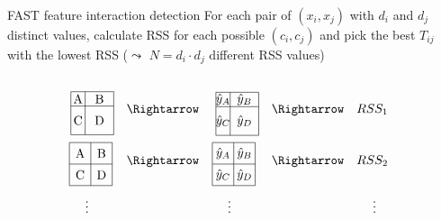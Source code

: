 \documentclass[11pt,compress,t,notes=noshow, aspectratio=169, xcolor=table]{beamer}
\begin{document}
\begin{frame}{FAST feature interaction detection}
For each pair of $(x_i,x_j)$ with $d_i$ and $d_j$ distinct values, calculate RSS for each possible $(c_i, c_j)$ and pick the best $T_{ij}$ with the lowest RSS ($\leadsto$ $N = d_i \cdot d_j$ different RSS values)

\begin{columns}[c, totalwidth=\textwidth]
    \begin{column}{0.45\textwidth}
\[
        \begin{array}{@{}l@{\quad}l@{\quad}l@{\quad}l@{\quad}l}
    \begin{tikzpicture}[baseline=(current bounding box.center)]
        \draw (0,0) rectangle (1.2,1.2);
        \draw (0.4,0) -- (0.4,1.2); 
        \draw (0,0.8) -- (1.2,0.8); 
        \node at (0.2,0.4) {C};
        \node at (0.8,0.4) {D};
        \node at (0.2,1) {A};
        \node at (0.8,1) {B};
    \end{tikzpicture} & \text{$\Rightarrow$} & \begin{tikzpicture}[baseline=(current bounding box.center)]
        \draw (0,0) rectangle (1.2,1.2);
        \draw (0.4,0) -- (0.4,1.2); 
        \draw (0,0.8) -- (1.2,0.8); 
        \node at (0.2,0.4) {$\hat{y}_C$};
        \node at (0.8,0.4) {$\hat{y}_D$};
        \node at (0.2,1) {$\hat{y}_A$};
        \node at (0.8,1) {$\hat{y}_B$};
    \end{tikzpicture} & \text{$\Rightarrow$} & \text{$RSS_1$}\\[0.7cm] 
    \begin{tikzpicture}[baseline=(current bounding box.center)]
        \draw (0,0) rectangle (1.2,1.2);
        \draw (0.6,0) -- (0.6,1.2); 
        \draw (0,0.6) -- (1.2,0.6); 
        \node at (0.3,0.3) {C};
        \node at (0.9,0.3) {D};
        \node at (0.3,0.9) {A};
        \node at (0.9,0.9) {B};
    \end{tikzpicture} & \text{$\Rightarrow$} & \begin{tikzpicture}[baseline=(current bounding box.center)]
        \draw (0,0) rectangle (1.2,1.2);
        \draw (0.6,0) -- (0.6,1.2); 
        \draw (0,0.6) -- (1.2,0.6); 
        \node at (0.3,0.3) {$\hat{y}_C$};
        \node at (0.9,0.3) {$\hat{y}_D$};
        \node at (0.3,0.9) {$\hat{y}_A$};
        \node at (0.9,0.9) {$\hat{y}_B$};
    \end{tikzpicture} & \text{$\Rightarrow$} & \text{$RSS_2$}\\[0.7cm] 
    \makebox[1cm][c]{\vdots} & & \makebox[1cm][c]{\vdots} & & \makebox[1cm][c]{\vdots}\\[0.3cm]

\end{array}\]
\end{column}
\end{columns}
\end{frame}
\end{document}
